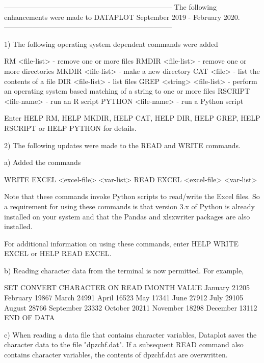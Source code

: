 -----------------------------------------------------------------------
The following enhancements were made to DATAPLOT
September 2019 - February 2020.
-----------------------------------------------------------------------

 1) The following operating system dependent commands were added

      RM      <file-list>    - remove one or more files
      RMDIR   <file-list>    - remove one or more directories
      MKDIR   <file-list>    - make a new directory
      CAT     <file>         - list the contents of a file
      DIR     <file-list>    - list files
      GREP <string> <file-list> - perform an operating system based
                                  matching of a string to one or more
                                  files
      RSCRIPT <file-name>    - run an R script
      PYTHON <file-name>     - run a Python script

    Enter HELP RM, HELP MKDIR, HELP CAT, HELP DIR, HELP GREP,
    HELP RSCRIPT or HELP PYTHON for details.

 2) The following updates were made to the READ and WRITE commands.

    a) Added the commands

          WRITE EXCEL <excel-file>  <var-list>
          READ  EXCEL <excel-file>  <var-list>

       Note that these commands invoke Python scripts to read/write the
       Excel files.  So a requirement for using these commands is that
       version 3.x of Python is already installed on your system and that
       the Pandas and xlsxwriter packages are also installed.

       For additional information on using these commands, enter
       HELP WRITE EXCEL or HELP READ EXCEL.

    b) Reading character data from the terminal is now permitted.
       For example,

          SET CONVERT CHARACTER ON
          READ IMONTH VALUE
          January    21205
          February   19867
          March      24991
          April      16523
          May        17341
          June       27912
          July       29105
          August     28766
          September  23332
          October    20211
          November   18298
          December   13112
          END OF DATA

    c) When reading a data file that contains character variables,
       Dataplot saves the character data to the file "dpzchf.dat".
       If a subsequent READ command also contains character variables,
       the contents of dpzchf.dat are overwritten.

